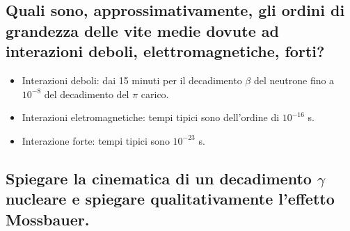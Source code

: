 \subsection[]{ Quali sono, approssimativamente, gli ordini di grandezza delle vite medie dovute ad interazioni deboli, elettromagnetiche, forti?}
\begin{itemize}
	\item Interazioni deboli: dai 15 minuti per il decadimento $\beta$ del neutrone fino a $10^{-8}$ del decadimento del  $\pi$ carico.
	\item Interazioni eletromagnetiche: tempi tipici sono dell'ordine di $10^{-16}$ s.
	\item Interazione forte: tempi tipici sono $10^{-23}$ s.
\end{itemize}

\subsection[]{ Spiegare la cinematica di un decadimento $\gamma$ nucleare e spiegare qualitativamente l'effetto Mossbauer. }
